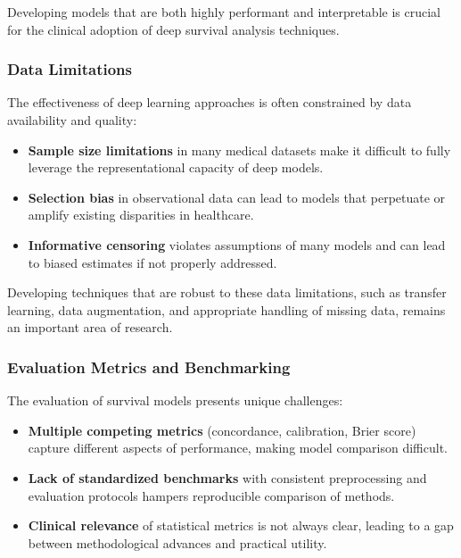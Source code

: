 Developing models that are both highly performant and interpretable is crucial for the clinical adoption of deep survival analysis techniques.

\subsubsection{Data Limitations}

The effectiveness of deep learning approaches is often constrained by data availability and quality:

\begin{itemize}
    \item \textbf{Sample size limitations} in many medical datasets make it difficult to fully leverage the representational capacity of deep models.
    
    \item \textbf{Selection bias} in observational data can lead to models that perpetuate or amplify existing disparities in healthcare.
    
    \item \textbf{Informative censoring} violates assumptions of many models and can lead to biased estimates if not properly addressed.
\end{itemize}

Developing techniques that are robust to these data limitations, such as transfer learning, data augmentation, and appropriate handling of missing data, remains an important area of research.

\subsubsection{Evaluation Metrics and Benchmarking}

The evaluation of survival models presents unique challenges:

\begin{itemize}
    \item \textbf{Multiple competing metrics} (concordance, calibration, Brier score) capture different aspects of performance, making model comparison difficult.
    
    \item \textbf{Lack of standardized benchmarks} with consistent preprocessing and evaluation protocols hampers reproducible comparison of methods.
    
    \item \textbf{Clinical relevance} of statistical metrics is not always clear, leading to a gap between methodological advances and practical utility.
\end{itemize}

